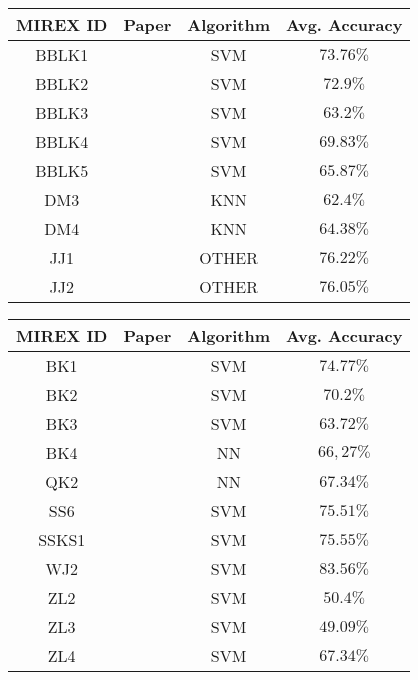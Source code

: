 \begin{center}

  \begin{tabularx}{\textwidth}{c|X|c|c}

    \textbf{MIREX ID} & \textbf{Paper} & \textbf{Algorithm} & \textbf{Avg. Accuracy} \\
    \hline

    BBLK1 & \citet{bbljk1_2013} & SVM & $73.76\%$ \\
    BBLK2 & \citet{bbljk_2013} & SVM & $72.9\%$ \\
    BBLK3 & \citet{bbljk_2013} & SVM & $63.2\%$ \\
    BBLK4 & \citet{bbljk_2013} & SVM & $69.83\%$ \\
    BBLK5 & \citet{bbljk_2013} & SVM & $65.87\%$ \\
    DM3 & \citet{dm_2013} & KNN & $62.4\%$ \\
    DM4 & \citet{dm_2013} & KNN & $64.38\%$ \\
    JJ1 & \citet{jj_2013} & OTHER & $76.22\%$ \\
    JJ2 & \citet{jj_2013} & OTHER & $76.05\%$ \\

  \end{tabularx}

  \label{tab:mirex2013}

\end{center}



\begin{center}

  \begin{tabularx}{\textwidth}{c|X|c|c}

    \textbf{MIREX ID} & \textbf{Paper} & \textbf{Algorithm} & \textbf{Avg. Accuracy} \\
    \hline

    BK1 & \citet{bk_2014} & SVM & $74.77\%$ \\
    BK2 & \citet{bk_2014} & SVM & $70.2\%$ \\
    BK3 & \citet{bk_2014} & SVM & $63.72\%$ \\
    BK4 & \citet{bk_2014} & NN & $66,27\%$ \\
    QK2 & \citet{qk_2014} & NN & $67.34\%$ \\
    SS6 & \citet{ss_2014} & SVM & $75.51\%$ \\
    SSKS1 & \citet{ssks_2014} & SVM & $75.55\%$ \\
    WJ2 & \citet{wj_2014} & SVM & $83.56\%$ \\
    ZL2 & \citet{zl_2014} & SVM & $50.4\%$ \\
    ZL3 & \citet{zl_2014} & SVM & $49.09\%$ \\
    ZL4 & \citet{zl_2014} & SVM & $67.34\%$ \\

  \end{tabularx}

  \label{tab:mirex2014}

\end{center}


